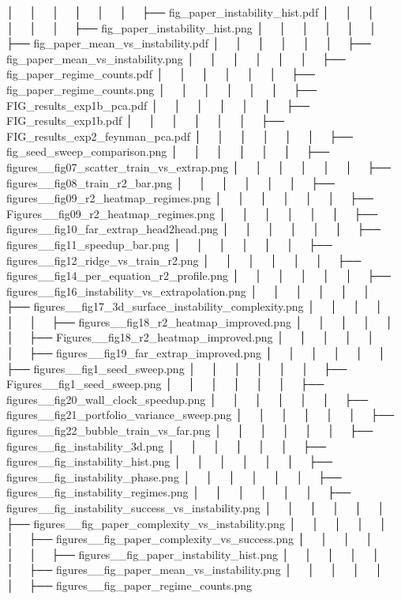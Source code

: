 │   │       │   │   │   │   ├── fig_paper_instability_hist.pdf
│   │       │   │   │   │   ├── fig_paper_instability_hist.png
│   │       │   │   │   │   ├── fig_paper_mean_vs_instability.pdf
│   │       │   │   │   │   ├── fig_paper_mean_vs_instability.png
│   │       │   │   │   │   ├── fig_paper_regime_counts.pdf
│   │       │   │   │   │   ├── fig_paper_regime_counts.png
│   │       │   │   │   │   ├── FIG_results_exp1b_pca.pdf
│   │       │   │   │   │   ├── FIG_results_exp1b.pdf
│   │       │   │   │   │   ├── FIG_results_exp2_feynman_pca.pdf
│   │       │   │   │   │   ├── fig_seed_sweep_comparison.png
│   │       │   │   │   │   ├── figures__fig07_scatter_train_vs_extrap.png
│   │       │   │   │   │   ├── figures__fig08_train_r2_bar.png
│   │       │   │   │   │   ├── figures__fig09_r2_heatmap_regimes.png
│   │       │   │   │   │   ├── Figures__fig09_r2_heatmap_regimes.png
│   │       │   │   │   │   ├── figures__fig10_far_extrap_head2head.png
│   │       │   │   │   │   ├── figures__fig11_speedup_bar.png
│   │       │   │   │   │   ├── figures__fig12_ridge_vs_train_r2.png
│   │       │   │   │   │   ├── figures__fig14_per_equation_r2_profile.png
│   │       │   │   │   │   ├── figures__fig16_instability_vs_extrapolation.png
│   │       │   │   │   │   ├── figures__fig17_3d_surface_instability_complexity.png
│   │       │   │   │   │   ├── figures__fig18_r2_heatmap_improved.png
│   │       │   │   │   │   ├── Figures__fig18_r2_heatmap_improved.png
│   │       │   │   │   │   ├── figures__fig19_far_extrap_improved.png
│   │       │   │   │   │   ├── figures__fig1_seed_sweep.png
│   │       │   │   │   │   ├── Figures__fig1_seed_sweep.png
│   │       │   │   │   │   ├── figures__fig20_wall_clock_speedup.png
│   │       │   │   │   │   ├── figures__fig21_portfolio_variance_sweep.png
│   │       │   │   │   │   ├── figures__fig22_bubble_train_vs_far.png
│   │       │   │   │   │   ├── figures__fig_instability_3d.png
│   │       │   │   │   │   ├── figures__fig_instability_hist.png
│   │       │   │   │   │   ├── figures__fig_instability_phase.png
│   │       │   │   │   │   ├── figures__fig_instability_regimes.png
│   │       │   │   │   │   ├── figures__fig_instability_success_vs_instability.png
│   │       │   │   │   │   ├── figures__fig_paper_complexity_vs_instability.png
│   │       │   │   │   │   ├── figures__fig_paper_complexity_vs_success.png
│   │       │   │   │   │   ├── figures__fig_paper_instability_hist.png
│   │       │   │   │   │   ├── figures__fig_paper_mean_vs_instability.png
│   │       │   │   │   │   ├── figures__fig_paper_regime_counts.png
